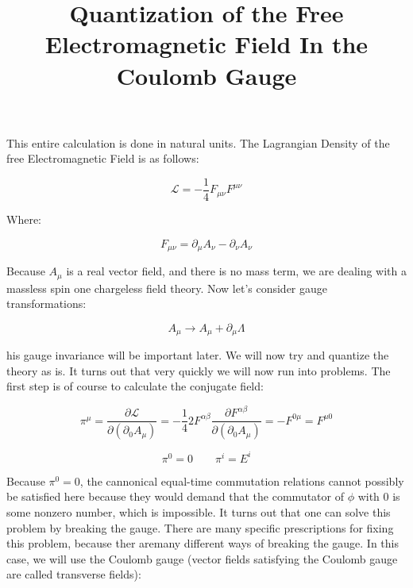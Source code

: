 \documentclass[a4]{article}
\begin{document}
    \title{Quantization of the Free Electromagnetic Field In the Coulomb Gauge}
    \maketitle

    This entire calculation is done in natural units. The Lagrangian Density of the free Electromagnetic Field is
    as follows:

    \begin{equation}
        \mathcal{L} = - \frac{1}{4} F_{\mu \nu} F^{\mu \nu}
    \end{equation}

    Where:

    \begin{equation}
        F_{\mu \nu} = \partial_{\mu} A_{\nu} - \partial_{\nu} A_{\nu}
    \end{equation}

    Because $A_{\mu}$ is a real vector field, and there is no mass term, we are dealing with a massless spin
    one chargeless field theory. Now let's consider gauge transformations:

    \begin{equation}
        A_{\mu} \rightarrow A_{\mu} + \partial_{\mu} \Lambda
    \end{equation}

    his gauge invariance will be important later. We will now try and quantize the theory as is. It turns out
    that very quickly we will now run into problems. The first step is of course to calculate the conjugate field:

    \begin{equation}
        \pi^{\mu} = \frac{\partial \mathcal{L}}{\partial (\partial_{0} A_{\mu})} = - \frac{1}{4} 2 F^{\alpha \beta} \frac{\partial F^{\alpha \beta}}{\partial (\partial_{0} A_{\mu})} = - F^{0 \mu} = F^{\mu 0}
    \end{equation}

    \begin{equation}
        \pi^{0} = 0 \qquad \pi^{i} = E^{i}
    \end{equation}

    Because $\pi^{0} = 0$, the cannonical equal-time commutation relations cannot possibly be satisfied here because they would demand that the commutator of $\phi$ with 0
    is some nonzero number, which is impossible. It turns out that one can solve this problem by breaking the gauge. There are many specific prescriptions for fixing this
    problem, because ther aremany different ways of breaking the gauge. In this case, we will use the Coulomb gauge (vector fields satisfying the Coulomb gauge are called
    transverse fields):
\end{document}
